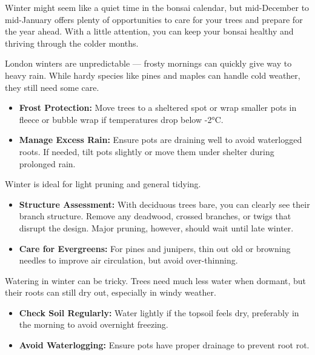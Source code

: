 \label{2024-12-care}
\noindent
Winter might seem like a quiet time in the bonsai calendar, but mid\--December to mid\--January offers plenty of opportunities to care for your trees and prepare for the year ahead.
With a little attention, you can keep your bonsai healthy and thriving through the colder months.

\noindent
London winters are unpredictable --- frosty mornings can quickly give way to heavy rain.
While hardy species like pines and maples can handle cold weather, they still need some care.

\begin{itemize}
    \item \textbf{Frost Protection:} Move trees to a sheltered spot or wrap smaller pots in fleece or bubble wrap if temperatures drop below -2°C.

    \item \textbf{Manage Excess Rain:} Ensure pots are draining well to avoid waterlogged roots.
    If needed, tilt pots slightly or move them under shelter during prolonged rain.
\end{itemize}

\noindent
Winter is ideal for light pruning and general tidying.

\begin{itemize}
    \item \textbf{Structure Assessment:} With deciduous trees bare, you can clearly see their branch structure.
    Remove any deadwood, crossed branches, or twigs that disrupt the design.
    Major pruning, however, should wait until late winter.

    \item \textbf{Care for Evergreens:} For pines and junipers, thin out old or browning needles to improve air circulation, but avoid over\--thinning.
\end{itemize}

\columnbreak
{}
\noindent
Watering in winter can be tricky.
Trees need much less water when dormant, but their roots can still dry out, especially in windy weather.

\begin{itemize}
    \item \textbf{Check Soil Regularly:} Water lightly if the topsoil feels dry, preferably in the morning to avoid overnight freezing.

    \item \textbf{Avoid Waterlogging:} Ensure pots have proper drainage to prevent root rot.
\end{itemize}


